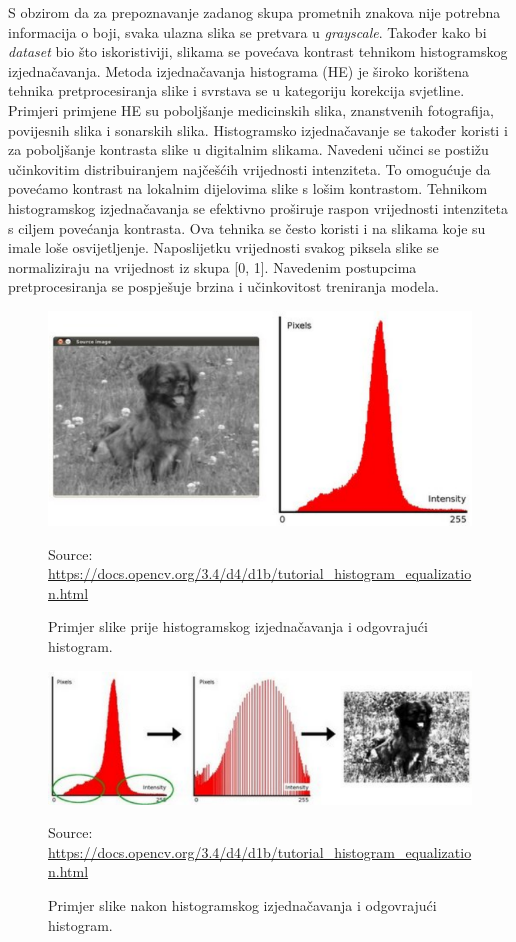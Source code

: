 \documentclass[times, utf8, zavrsni]{fer}
\newcommand{\source}[1]{\caption*{Source: {#1}} }
\begin{document}
S obzirom da za prepoznavanje zadanog skupa prometnih znakova nije potrebna informacija o boji, svaka ulazna slika se pretvara u \emph{grayscale}.
Također kako bi \emph{dataset} bio što iskoristiviji, slikama se povećava kontrast tehnikom histogramskog izjednačavanja. Metoda izjednačavanja histograma (HE) je široko korištena tehnika pretprocesiranja slike i svrstava se u kategoriju korekcija svjetline. 
Primjeri primjene HE su poboljšanje medicinskih slika, znanstvenih fotografija, povijesnih slika i sonarskih slika. Histogramsko izjednačavanje se također koristi i za poboljšanje kontrasta slike u digitalnim slikama. 
Navedeni učinci se postižu učinkovitim distribuiranjem najčešćih vrijednosti intenziteta. To omogućuje da povećamo kontrast na lokalnim dijelovima slike s lošim kontrastom.\citep{9642082}
Tehnikom histogramskog izjednačavanja se efektivno proširuje raspon vrijednosti intenziteta s ciljem povećanja kontrasta. Ova tehnika se često koristi i na slikama koje su imale loše osvijetljenje.
Naposlijetku vrijednosti svakog piksela slike se normaliziraju na vrijednost iz skupa [0, 1]. Navedenim postupcima pretprocesiranja se pospješuje brzina i učinkovitost treniranja modela.
\begin{figure}[h!]
  \includegraphics[width=\linewidth,trim=4 4 4 4,clip]{images/hist1.png}
  \caption{Primjer slike prije histogramskog izjednačavanja i odgovrajući histogram.}
  \source{\url{https://docs.opencv.org/3.4/d4/d1b/tutorial_histogram_equalization.html}}
\end{figure}
\begin{figure}[h!]
  \includegraphics[width=\linewidth,trim=4 4 4 4,clip]{images/hist2.png}
  \caption{Primjer slike nakon histogramskog izjednačavanja i odgovrajući histogram.}
  \source{\url{https://docs.opencv.org/3.4/d4/d1b/tutorial_histogram_equalization.html}}
\end{figure}
\pagebreak
\clearpage
\end{document}
